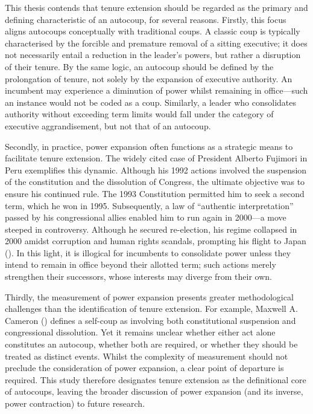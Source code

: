 \documentclass[
  12pt,
]{report}
\begin{document}
This thesis contends that tenure extension should be regarded as the
primary and defining characteristic of an autocoup, for several reasons.
Firstly, this focus aligns autocoups conceptually with traditional
coups. A classic coup is typically characterised by the forcible and
premature removal of a sitting executive; it does not necessarily entail
a reduction in the leader's powers, but rather a disruption of their
tenure. By the same logic, an autocoup should be defined by the
prolongation of tenure, not solely by the expansion of executive
authority. An incumbent may experience a diminution of power whilst
remaining in office---such an instance would not be coded as a coup.
Similarly, a leader who consolidates authority without exceeding term
limits would fall under the category of executive aggrandisement, but
not that of an autocoup.

Secondly, in practice, power expansion often functions as a strategic
means to facilitate tenure extension. The widely cited case of President
Alberto Fujimori in Peru exemplifies this dynamic. Although his 1992
actions involved the suspension of the constitution and the dissolution
of Congress, the ultimate objective was to ensure his continued rule.
The 1993 Constitution permitted him to seek a second term, which he won
in 1995. Subsequently, a law of ``authentic interpretation'' passed by
his congressional allies enabled him to run again in 2000---a move
steeped in controversy. Although he secured re-election, his regime
collapsed in 2000 amidst corruption and human rights scandals, prompting
his flight to Japan (). In this
light, it is illogical for incumbents to consolidate power unless they
intend to remain in office beyond their allotted term; such actions
merely strengthen their successors, whose interests may diverge from
their own.

Thirdly, the measurement of power expansion presents greater
methodological challenges than the identification of tenure extension.
For example, Maxwell A. Cameron ()
defines a self-coup as involving both constitutional suspension and
congressional dissolution. Yet it remains unclear whether either act
alone constitutes an autocoup, whether both are required, or whether
they should be treated as distinct events. Whilst the complexity of
measurement should not preclude the consideration of power expansion, a
clear point of departure is required. This study therefore designates
tenure extension as the definitional core of autocoups, leaving the
broader discussion of power expansion (and its inverse, power
contraction) to future research.
\end{document}
